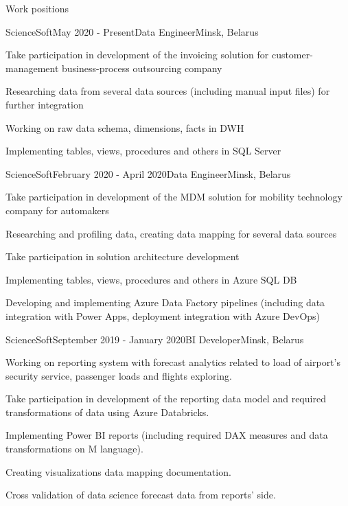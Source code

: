 \documentclass{resume} %
\begin{document}
\begin{rSection}{Work positions}

\begin{rSubsection}{ScienceSoft}{May 2020 - Present}{Data Engineer}{Minsk, Belarus}
\item Take participation in development of the invoicing solution for customer-management business-process outsourcing company
\item Researching data from several data sources (including manual input files) for further integration
\item Working on raw data schema, dimensions, facts in DWH
\item Implementing tables, views, procedures and others in SQL Server
\end{rSubsection}

\begin{rSubsection}{ScienceSoft}{February 2020 - April 2020}{Data Engineer}{Minsk, Belarus}
\item Take participation in development of the MDM solution for mobility technology company for automakers
\item Researching and profiling data, creating data mapping for several data sources
\item Take participation in solution architecture development
\item Implementing tables, views, procedures and others in Azure SQL DB
\item Developing and implementing Azure Data Factory pipelines (including data integration with Power Apps, deployment integration with Azure DevOps)
\end{rSubsection}

\begin{rSubsection}{ScienceSoft}{September 2019 - January 2020}{BI Developer}{Minsk, Belarus}
\item Working on reporting system with forecast analytics related to load of airport's security service, passenger loads and flights exploring.
\item Take participation in development of the reporting data model and required transformations of data using Azure Databricks.
\item Implementing Power BI reports (including required DAX measures and data transformations on M language).
\item Creating visualizations data mapping documentation.
\item Cross validation of data science forecast data from reports' side.
\end{rSubsection}


\end{rSection}
\end{document}
